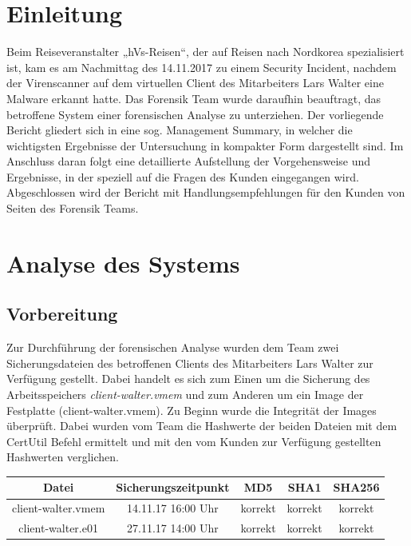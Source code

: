 \chapter{Einleitung}

Beim  Reiseveranstalter „hVs-Reisen“, der auf Reisen nach Nordkorea spezialisiert ist, kam es am Nachmittag des 14.11.2017 zu einem Security Incident, nachdem der
Virenscanner auf dem virtuellen Client des Mitarbeiters Lars Walter eine Malware
erkannt hatte.
Das Forensik Team wurde daraufhin beauftragt, das betroffene System einer forensischen Analyse zu unterziehen. Der vorliegende Bericht gliedert sich in eine sog. Management Summary, in welcher die wichtigsten Ergebnisse der Untersuchung in kompakter Form dargestellt sind. Im Anschluss daran folgt eine detaillierte Aufstellung der Vorgehensweise und Ergebnisse, in der speziell auf die Fragen des Kunden eingegangen wird. Abgeschlossen wird der Bericht mit Handlungsempfehlungen für den Kunden von Seiten des Forensik Teams.

\chapter{Analyse des Systems}

\section{Vorbereitung}
Zur Durchführung der forensischen Analyse wurden dem Team zwei Sicherungsdateien des betroffenen Clients des Mitarbeiters Lars Walter zur Verfügung gestellt. Dabei handelt es sich zum Einen um die Sicherung des Arbeitsspeichers \textit{client-walter.vmem} und zum Anderen um ein Image der Festplatte (client-walter.vmem). 
Zu Beginn wurde die Integrität der Images überprüft. Dabei wurden vom Team die Hashwerte der beiden Dateien mit dem CertUtil Befehl ermittelt und mit den vom Kunden zur Verfügung gestellten Hashwerten verglichen.


\begin{center}
	\begin{tabular}{|c|c|c|c|c|} 
		\hline
		Datei & Sicherungszeitpunkt & MD5 & SHA1 & SHA256 \\ [0.5ex] 
		\hline
		client-walter.vmem & 14.11.17 16:00 Uhr & korrekt & korrekt & korrekt \\ 
		\hline
		client-walter.e01 & 27.11.17 14:00 Uhr & korrekt & korrekt & korrekt \\ 
		\hline
	\end{tabular}
\end{center}

